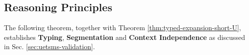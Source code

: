 

\subsection{Reasoning Principles}
The following theorem, together with Theorem \ref{thm:typed-expansion-short-U}, establishes \textbf{Typing}, \textbf{Segmentation} and \textbf{Context Independence} as discussed in Sec. \ref{sec:uetsms-validation}.

